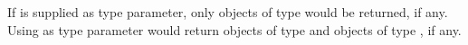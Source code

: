 If  is supplied as type parameter, only objects of type  would be returned, if any.
Using  as type parameter would return objects of type  and objects of type , if any.
	

